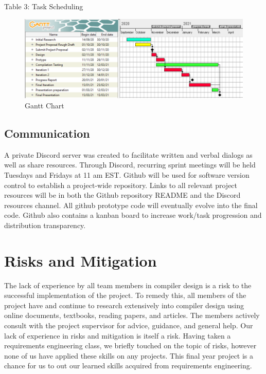 \documentclass[11pt]{article}
\begin{document}
\begin{center}
Table 3: Task Scheduling
\end{center}

\pagebreak

\begin{figure}[hbt]
   \begin{center}
     \includegraphics[width=170mm]{ganttchart.png}
   \end{center}
  \caption{Gantt Chart}
  \label{fig-sysdesov}
 \end{figure}

\subsection{Communication}

A private Discord server was created to facilitate written and verbal dialogs as well as share resources. Through Discord, recurring sprint meetings will be held Tuesdays and Fridays at 11 am EST. Github will be used for software version control to establish a project-wide repository.  Links to all relevant project resources will be in both the Github repository README and the Discord resources channel. All github prototype code will eventually evolve into the final code. Github also contains a kanban board to increase work/task progression and distribution transparency.

\section{Risks and Mitigation}

The lack of experience by all team members in compiler design is a risk to the successful implementation of the project. To remedy this, all members of the project have and continue to research extensively into compiler design using online documents, textbooks, reading papers, and articles. The members actively consult with the project supervisor for advice, guidance, and general help.
Our lack of experience in risks and mitigation is itself a risk. Having taken a requirements engineering class, we briefly touched on the topic of risks, however none of us have applied these skills on any projects. This final year project is a chance for us to out our learned skills acquired from requirements engineering.
\end{document}
